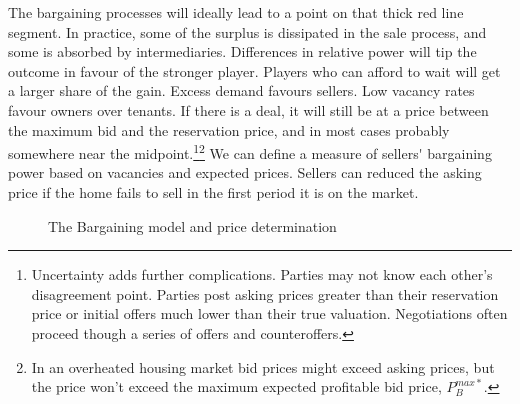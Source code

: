 {The bargaining processes will ideally lead to  a point on that thick red line segment.  In practice, some of the surplus is dissipated in the sale process, and some is absorbed by intermediaries. Differences in relative power will tip the outcome in favour of the stronger player.   Players who can afford to wait will get a larger share of the gain. Excess demand favours sellers. Low vacancy rates favour owners over tenants.   If there is a deal,  it will still be at a price between the maximum bid and the reservation price, and in most cases probably somewhere near the midpoint.\footnote{Uncertainty adds further complications. Parties may not know each other's disagreement point. Parties  post  asking prices greater than their reservation price or initial offers much lower than their true valuation.  
Negotiations often proceed though a series of offers and counteroffers.}\footnote{In an overheated housing market bid prices might exceed asking prices, but the price won't exceed the maximum expected profitable bid price, $P_B^{max*}$.} We can  define a measure of \gls{sellers' bargaining power} based on vacancies and expected prices.  Sellers can reduced the asking price  if the home fails to sell in the first period it is on the market. }%


 

    \begin{figure}[!hb]
    \centering
    
    \caption{The Bargaining model and price determination}
    \label{fig:Bargaining}
    \end{figure}



